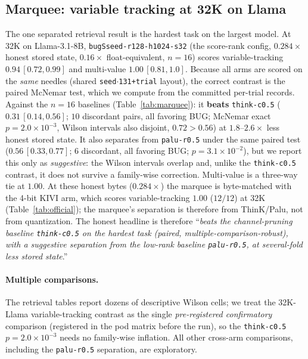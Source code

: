\documentclass[11pt]{article}
\begin{document}
\subsection{Marquee: variable tracking at 32K on Llama}
\label{sec:marquee}
The one separated retrieval result is the hardest task on the largest model. At
32K on Llama-3.1-8B, \texttt{bugSseed-r128-h1024-s32} (the score-rank config,
$0.284\times$ honest stored state, $0.16\times$ float-equivalent, $n{=}16$) scores
variable-tracking $0.94\,[0.72,0.99]$
and multi-value $1.00\,[0.81,1.0]$. Because all arms are scored on the
\emph{same} needles (shared \texttt{seed$\cdot$131+trial} layout), the correct
contrast is the paired McNemar test, which we compute from the committed
per-trial records. Against the $n{=}16$ baselines
(Table~\ref{tab:marquee}): it \textbf{beats} \texttt{think-c0.5}
($0.31\,[0.14,0.56]$; $10$ discordant pairs, all favoring BUG; McNemar exact
$p=2.0\times10^{-3}$, Wilson intervals also disjoint, $0.72>0.56$) at
$1.8$--$2.6\times$ less honest stored state. It also separates from \texttt{palu-r0.5}
under the same paired test ($0.56\,[0.33,0.77]$; $6$ discordant, all favoring BUG;
$p=3.1\times10^{-2}$), but we report this only as \emph{suggestive}: the Wilson
intervals overlap and, unlike the \texttt{think-c0.5} contrast, it does not
survive a family-wise correction. Multi-value is a three-way tie at $1.00$. At
these honest bytes ($0.284\times$) the marquee is byte-matched with the 4-bit KIVI
arm, which scores variable-tracking $1.00$ ($12/12$) at 32K
(Table~\ref{tab:official}); the marquee's separation is therefore from
ThinK/Palu, not from quantization. The
honest headline is therefore ``\emph{beats the channel-pruning baseline
\texttt{think-c0.5} on the hardest task (paired, multiple-comparison-robust), with
a suggestive separation from the low-rank baseline \texttt{palu-r0.5}, at
several-fold less stored state}.''

\paragraph{Multiple comparisons.} The retrieval tables report dozens of descriptive
Wilson cells; we treat the 32K-Llama variable-tracking contrast as the single
\emph{pre-registered confirmatory} comparison (registered in the pod matrix before
the run), so the \texttt{think-c0.5} $p=2.0\times10^{-3}$ needs no family-wise
inflation. All other cross-arm comparisons, including the \texttt{palu-r0.5}
separation, are exploratory.
\end{document}
